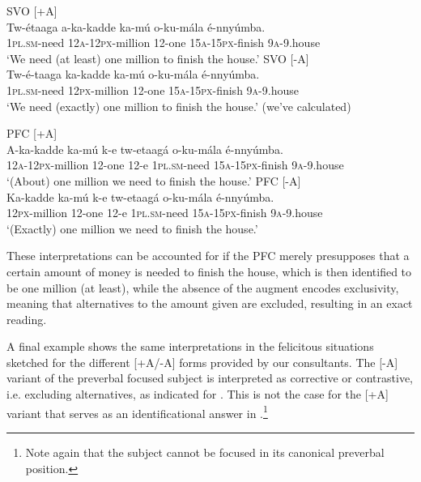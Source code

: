 \documentclass[output=paper]{langsci/langscibook}
\begin{document}
\ea\label{ex:vanderwal:40}
\ea\label{ex:vanderwal:40a}    {SVO [+A]}\\
\gll   Tw-étaaga  a-ka-kadde    ka-mú  o-ku-mála    é-nnyúmba.\\
       \textsc{1pl}.\textsc{sm}-need  \textsc{12a}-\textsc{12px}-million  12-one  \textsc{15a}-\textsc{15px}-finish  \textsc{9a}-9.house\\
\glt   ‘We need (at least) one million to finish the house.’
\ex \label{ex:vanderwal:40b}
 SVO [-A]\\
\gll Tw-é-taaga  ka-kadde  ka-mú  o-ku-mála    é-nnyúmba.\\
     \textsc{1pl}.\textsc{sm}-need  \textsc{12px}-million  12-one  \textsc{15a}-\textsc{15px}-finish  \textsc{9a}-9.house\\
\glt ‘We need (exactly) one million to finish the house.’ (we’ve calculated)
\z
\z

\ea\label{ex:vanderwal:41}
\ea\label{ex:vanderwal:41a}PFC [+A]\\
\gll A-ka-kadde  ka-mú  k-e  tw-etaagá  o-ku-mála    é-nnyúmba.\\
     \textsc{12a}-\textsc{12px}-million  12-one  12-e  \textsc{1pl}.\textsc{sm}-need  \textsc{15a}-\textsc{15px}-finish  \textsc{9a}-9.house\\
\glt ‘(About) one million we need to finish the house.’
\ex \label{ex:vanderwal:41b}
  PFC [-A]\\
\gll Ka-kadde    ka-mú  k-e  tw-etaagá  o-ku-mála    é-nnyúmba.\\
     \textsc{12px}-million  12-one  12-e  \textsc{1pl}.\textsc{sm}-need  \textsc{15a}-\textsc{15px}-finish  \textsc{9a}-9.house\\
\glt ‘(Exactly) one million we need to finish the house.’
\z
\z

These interpretations can be accounted for if the PFC merely presupposes that a certain amount of money is needed to finish the house, which is then identified to be one million (at least), while the absence of the augment encodes exclusivity, meaning that alternatives to the amount given are excluded, resulting in an exact reading.

A final example shows the same interpretations in the felicitous situations sketched for the different [+A/-A] forms provided by our consultants. The [-A] variant of the preverbal focused subject is interpreted as corrective or contrastive, i.e. excluding alternatives, as indicated for . This is not the case for the [+A] variant that serves as an identificational answer in .\footnote{Note again that the subject cannot be focused in its canonical preverbal position.}
\end{document}
